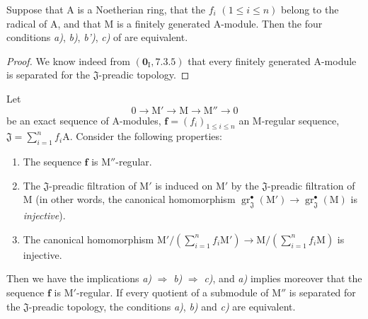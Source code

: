 \begin{corollary}[19.5.2]
\label{IV.19.5.2}
Suppose that $\mathrm{A}$ is a Noetherian ring, that the $f_i$ $(1\leqslant i\leqslant n)$ belong to the radical of $\mathrm{A}$, and that $\mathrm{M}$ is a finitely generated $\mathrm{A}$-module. Then the four conditions \emph{a)}, \emph{b)}, \emph{b')}, \emph{c)} of \emph{} are equivalent.
\end{corollary}

\begin{proof}
We know indeed from $(\mathbf{0}_\mathrm{I},7.3.5)$ that every finitely generated $\mathrm{A}$-module is separated for the $\mathfrak{J}$-preadic topology.
\end{proof}

\begin{proposition}[19.5.3]
\label{IV.19.5.3}
Let
\[
  0\to\mathrm{M}'\to\mathrm{M}\to\mathrm{M}''\to 0
\]
be an exact sequence of $\mathrm{A}$-modules, $\mathbf{f}=(f_i)_{1\leqslant i\leqslant n}$ an M-regular sequence, $\mathfrak{J}=\sum_{i=1}^{n}f_i\mathrm{A}$. Consider the following properties:
\begin{enumerate}
\item[\rm a)] The sequence $\mathbf{f}$ is $\mathrm{M}''$-regular.
\item[\rm b)] The $\mathfrak{J}$-preadic filtration of $\mathrm{M}'$ is induced on $\mathrm{M}'$ by the $\mathfrak{J}$-preadic filtration of $\mathrm{M}$ \textup{(in other words, the canonical homomorphism $\operatorname{gr}_\mathfrak{J}^\bullet(\mathrm{M}')\to\operatorname{gr}_\mathfrak{J}^\bullet(\mathrm{M})$ is \emph{injective})}.
\item[\rm c)] The canonical homomorphism $\mathrm{M}'/(\sum_{i=1}^{n}f_i\mathrm{M}')\to\mathrm{M}/(\sum_{i=1}^{n}f_i\mathrm{M})$ is injective.
\end{enumerate}
Then we have the implications \emph{a)} $\Rightarrow$ \emph{b)} $\Rightarrow$ \emph{c)}, and \emph{a)} implies moreover that the sequence $\mathbf{f}$ is $\mathrm{M}'$-regular.
If every quotient of a submodule of $\mathrm{M}''$ is separated for the $\mathfrak{J}$-preadic topology, the conditions \emph{a)}, \emph{b)} and \emph{c)} are equivalent.
\end{proposition}

